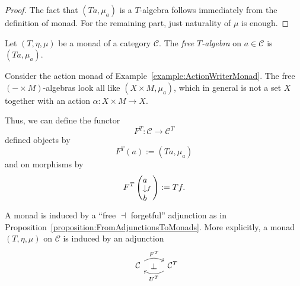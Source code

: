 \begin{proof}
  The fact that \((Ta, \mu_a)\) is a \(T\)-algebra follows immediately
  from the definition of monad. For the remaining part, just naturality
  of \(\mu\) is enough.
\end{proof}

\begin{definition}
  Let \((T, \eta, \mu)\) be a monad of a category \(\mathcal{C}\). The {\em free
    \(T\)-algebra} on \(a \in \mathcal{C}\) is \((Ta, \mu_a)\).
\end{definition}

\begin{example}
  Consider the action monad of
  Example~\ref{example:ActionWriterMonad}. The free
  \((- \times M)\)-algebras look all like \((X \times M, \mu_a)\), which in general
  is not a set \(X\) together with an action \(\alpha : X \times M \to X\).
\end{example}

Thus, we can define the functor
\[
  F^T : \mathcal{C} \to \mathcal{C}^T
\]
defined objects by
\[
  F^T (a) := \left( Ta, \mu_a \right)
\]
and on morphisms by
\[
  F^T \left( \begin{tikzcd}[row sep=small, cramped] a \ar["{f}", d]
      \\ b \end{tikzcd} \right) := Tf .
\]

\begin{proposition}
  A monad is induced by a ``free \(\dashv\) forgetful'' adjunction as in
  Proposition~\ref{proposition:FromAdjunctionsToMonads}. More explicitly, a monad
  \((T, \eta, \mu)\) on \(\mathcal{C}\) is induced by an adjunction
  \[
    \begin{tikzcd}
      \phantom{\mathcal{C}^T}\mathllap{\mathcal{C}} \ar["{F^T}"{name=left}, r, bend left] & \mathcal{C}^T \ar["{U^T}"{name=right},
      l, bend left] \ar["{\perp}"description, phantom, from=left, to=right]
    \end{tikzcd}
  \]
\end{proposition}

